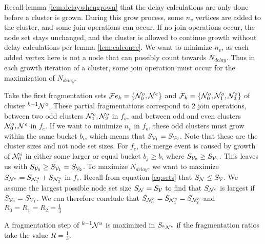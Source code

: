 Recall lemma \ref{lem:delaywhengrown} that the delay calculations are only done before a cluster is grown. During this grow process, some $n_v$ vertices are added to the cluster, and some join operations can occur. If no join operations occur, the node set stays unchanged, and the cluster is allowed to continue growth without delay calculations per lemma \ref{lem:calconce}. We want to minimize $n_v$, as each added vertex here is not a node that can possibly count towards $N_{delay}$. Thus in each growth iteration of a cluster, some join operation must occur for the maximization of $N_{delay}$.

Take the first fragmentation sets $\mathcal{F}e_{k} = \{\mathcal{N}^o_0, \mathcal{N}^{e} \}$ and $\mathcal{F}_{k} = \{\mathcal{N}^o_0, \mathcal{N}^{o}_1, \mathcal{N}^{o}_2 \}$ of cluster ${}^{k-1}\mathcal{N}^o$. These partial fragmentations correspond to 2 join operations, between two odd clusters $ \mathcal{N}^{o}_1, \mathcal{N}^{o}_2 $ in $f_o$, and between odd and even clusters $\mathcal{N}^o_0, \mathcal{N}^{e} $ in $f_e$. If we want to minimize $n_v$ in $f_o$, these odd clusters must grow within the same bucket $b_i$, which means that $S_{\mathcal{V}_1} = S_{\mathcal{V}_2}$. Note that these are the cluster sizes and not node set sizes. For $f_e$, the merge event is caused by growth of $\mathcal{N}^o_0$ in either some larger or equal bucket $b_j \geq b_i$ where $ S_{\mathcal{V}_0} \geq S_{\mathcal{V}_1} $. This leaves us with $S_{\mathcal{V}_0} \geq S_{\mathcal{V}_1} = S_{\mathcal{V}_2}$. To maximize $N_{delay}$, we want to maximize $S_{\mathcal{N}^e} = S_{\mathcal{N}^o_1} + S_{\mathcal{N}^o_2}$ in $f_e$. Recall from equation \ref{eq:sets} that $S_{\mathcal{N}} \leq S_{\mathcal{V}}$. We assume the largest possible node set size $S_{\mathcal{N}} = S_{\mathcal{V}}$ to find that $ S_{\mathcal{N}^e} $ is largest if $S_{\mathcal{V}_0} = S_{\mathcal{V}_1}$. We can therefore conclude that $S_{\mathcal{N}^o_0} = S_{\mathcal{N}^o_1} = S_{\mathcal{N}^o_2}$ and $R_0 = R_1 = R_2 = \frac{1}{3}$

\begin{lemma}\label{lem:thirdratio}
  A fragmentation step of ${}^{k-1}\mathcal{N}^o$ is maximized in $S_{{}^{k}\mathcal{N}^e}$ if the fragmentation ratios take the value $R = \frac{1}{3}$.
\end{lemma}

